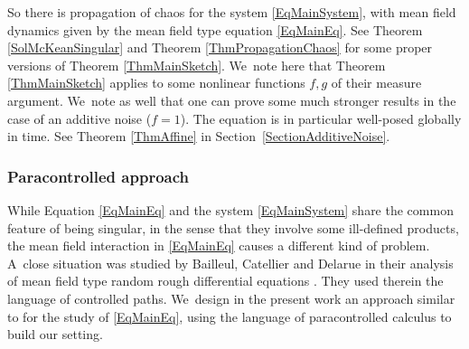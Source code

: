 \documentclass[JEP,XML,SOM,Unicode,published]{cedram}
\theoremstyle{definition}
\begin{document}
So there is propagation of chaos for the system \eqref{EqMainSystem}, with mean field dynamics given by the mean field type equation \eqref{EqMainEq}. See Theorem \ref{SolMcKeanSingular} and Theorem \ref{ThmPropagationChaos} for some proper versions of Theorem \ref{ThmMainSketch}. We~note here that Theorem \ref{ThmMainSketch} applies to some nonlinear functions $f,g$ of their measure argument. We~note as well that one can prove some much stronger results in the case of an additive noise ($f=1$). The equation is in particular well-posed globally in time. See Theorem \ref{ThmAffine} in Section~\ref{SectionAdditiveNoise}.

\subsubsection{Paracontrolled approach} While Equation \eqref{EqMainEq} and the system \eqref{EqMainSystem} share the common feature of being singular, in the sense that they involve some ill-defined products, the mean field interaction in \eqref{EqMainEq} causes a different kind of problem. A~close situation was studied by Bailleul, Catellier and Delarue in their analysis of mean field type random rough differential equations \cite{BailleulCatellierDelarue}. They used therein the language of controlled paths. We~design in the present work an approach similar to \cite{BailleulCatellierDelarue,roughchaos} for the study of \eqref{EqMainEq}, using the language of paracontrolled calculus to build our setting.
\end{document}
